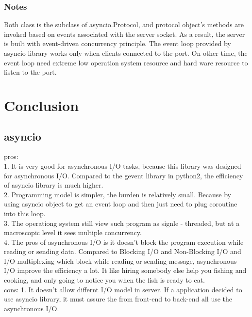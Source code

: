 \documentclass[10pt, a4paper]{IEEEtran}
\begin{document}
    \subsubsection{Notes}
    Both class is the subclass of asyncio.Protocol, and protocol object's methods are invoked based on events associated with the server socket. As a result, the server is built with event-driven concurrency principle. The event loop provided by asyncio library works only when clients connected to the port. On other time, the event loop need extreme low operation system resource and hard ware resource to listen to the port.\\
    \section{Conclusion}
    \subsection*{asyncio}
    pros:\\
    1. It is very good for asynchronous I/O tasks, because this library was designed for asynchronous I/O. Compared to the gevent library in python2, the efficiency of asyncio library is much higher.\\
    2. Programming model is simpler, the burden is relatively small. Because by using asyncio object to get an event loop and then just need to plug coroutine into this loop.\\
    3. The operationg system still view such program as signle - threaded, but at a macroscopic level it sees multiple concurrency.\\
    4. The pros of asynchronous I/O is it doesn't block the program execution while reading or sending data. Compared to Blocking I/O and Non-Blocking I/O and I/O multiplexing which block while reading or sending message, asynchronous I/O improve the efficiency a lot. It like hiring somebody else help you fishing and cooking, and only going to notice you when the fish is ready to eat.\\
    cons:
    1. It doesn't allow differnt I/O model in server. If a application decided to use asyncio library, it must assure the from front-end to back-end all use the asynchronous I/O.
\end{document}
